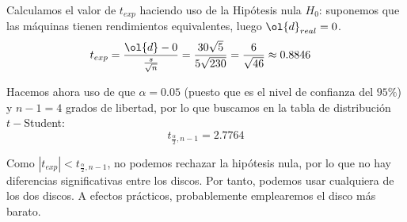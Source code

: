 \documentclass[12pt]{article}
\begin{document}
\begin{ejercicio}[2 puntos]
        Calculamos el valor de $t_{exp}$ haciendo uso de la Hipótesis nula $H_0$: suponemos que las máquinas tienen rendimientos equivalentes, luego $\ol{d}_{real}=0$.
        \begin{align*}
            t_{exp} &= \frac{\ol{d} - 0}{\frac{s}{\sqrt{n}}}
            = \frac{30\sqrt{5}}{5\sqrt{230}}
            = \frac{6}{\sqrt{46}} \approx 0.8846
        \end{align*}

        Hacemos ahora uso de que $\alpha=0.05$ (puesto que es el nivel de confianza del $95\%$) y $n-1=4$ grados de libertad, por lo que buscamos en la tabla de distribución $t-$Student:
        \begin{equation*}
            t_{\frac{\alpha}{2},n-1} = 2.7764
        \end{equation*}

        Como $|t_{exp}| < t_{\frac{\alpha}{2},n-1}$, no podemos rechazar la hipótesis nula, por lo que no hay diferencias significativas entre los discos. Por tanto, podemos usar cualquiera de los dos discos. A efectos prácticos, probablemente emplearemos el disco más barato.
    \end{ejercicio}
\end{document}
